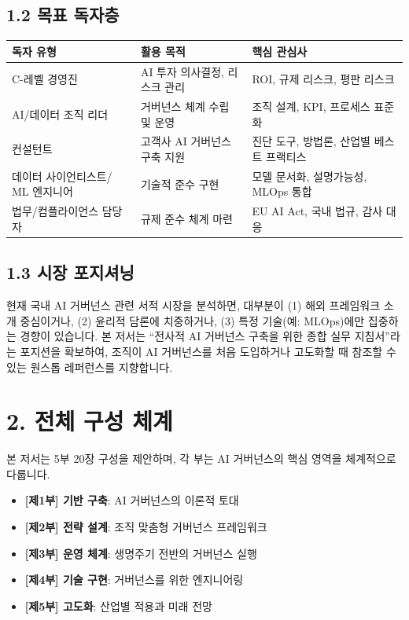 \subsection*{1.2 목표 독자층}
\begin{center}
\begin{tabular}{|p{}|p{}|p{}|}
\hline
\textbf{독자 유형} & \textbf{활용 목적} & \textbf{핵심 관심사} \\
\hline
C-레벨 경영진 & AI 투자 의사결정, 리스크 관리 & ROI, 규제 리스크, 평판 리스크 \\
\hline
AI/데이터 조직 리더 & 거버넌스 체계 수립 및 운영 & 조직 설계, KPI, 프로세스 표준화 \\
\hline
컨설턴트 & 고객사 AI 거버넌스 구축 지원 & 진단 도구, 방법론, 산업별 베스트 프랙티스 \\
\hline
데이터 사이언티스트/ \newline ML 엔지니어 & 기술적 준수 구현 & 모델 문서화, 설명가능성, MLOps 통합 \\
\hline
법무/컴플라이언스 담당자 & 규제 준수 체계 마련 & EU AI Act, 국내 법규, 감사 대응 \\
\hline
\end{tabular}
\end{center}

\subsection*{1.3 시장 포지셔닝}
현재 국내 AI 거버넌스 관련 서적 시장을 분석하면, 대부분이 (1) 해외 프레임워크 소개 중심이거나, (2) 윤리적 담론에 치중하거나, (3) 특정 기술(예: MLOps)에만 집중하는 경향이 있습니다. 본 저서는 ``전사적 AI 거버넌스 구축을 위한 종합 실무 지침서''라는 포지션을 확보하여, 조직이 AI 거버넌스를 처음 도입하거나 고도화할 때 참조할 수 있는 원스톱 레퍼런스를 지향합니다.

\vspace{0.8cm}
\section*{2. 전체 구성 체계}
본 저서는 5부 20장 구성을 제안하며, 각 부는 AI 거버넌스의 핵심 영역을 체계적으로 다룹니다.
\begin{itemize}
 \item \textbf{[제1부] 기반 구축}: AI 거버넌스의 이론적 토대
 \item \textbf{[제2부] 전략 설계}: 조직 맞춤형 거버넌스 프레임워크
 \item \textbf{[제3부] 운영 체계}: 생명주기 전반의 거버넌스 실행
 \item \textbf{[제4부] 기술 구현}: 거버넌스를 위한 엔지니어링
 \item \textbf{[제5부] 고도화}: 산업별 적용과 미래 전망
 \end{itemize}

